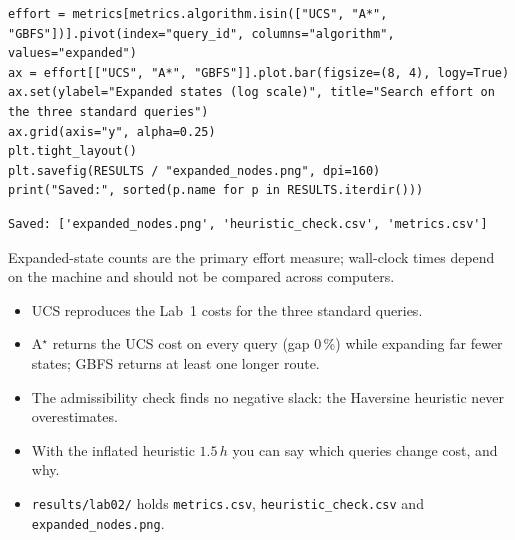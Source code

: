 \begin{labanswer}
\begin{lstlisting}[style=utppython]
effort = metrics[metrics.algorithm.isin(["UCS", "A*", "GBFS"])].pivot(index="query_id", columns="algorithm", values="expanded")
ax = effort[["UCS", "A*", "GBFS"]].plot.bar(figsize=(8, 4), logy=True)
ax.set(ylabel="Expanded states (log scale)", title="Search effort on the three standard queries")
ax.grid(axis="y", alpha=0.25)
plt.tight_layout()
plt.savefig(RESULTS / "expanded_nodes.png", dpi=160)
print("Saved:", sorted(p.name for p in RESULTS.iterdir()))
\end{lstlisting}
\expectedoutput
\begin{lstlisting}[style=utpterminal]
Saved: ['expanded_nodes.png', 'heuristic_check.csv', 'metrics.csv']
\end{lstlisting}
Expanded-state counts are the primary effort measure; wall-clock times depend on the machine and should not be compared across computers.
\end{labanswer}

\begin{verification}
\begin{itemize}
  \item UCS reproduces the Lab~1 costs for the three standard queries.
  \item A$^\star$ returns the UCS cost on every query (gap 0\,\%) while expanding far fewer states; GBFS returns at least one longer route.
  \item The admissibility check finds no negative slack: the Haversine heuristic never overestimates.
  \item With the inflated heuristic $1.5\,h$ you can say which queries change cost, and why.
  \item \texttt{results/lab02/} holds \texttt{metrics.csv}, \texttt{heuristic\_check.csv} and \texttt{expanded\_nodes.png}.
\end{itemize}
\end{verification}
